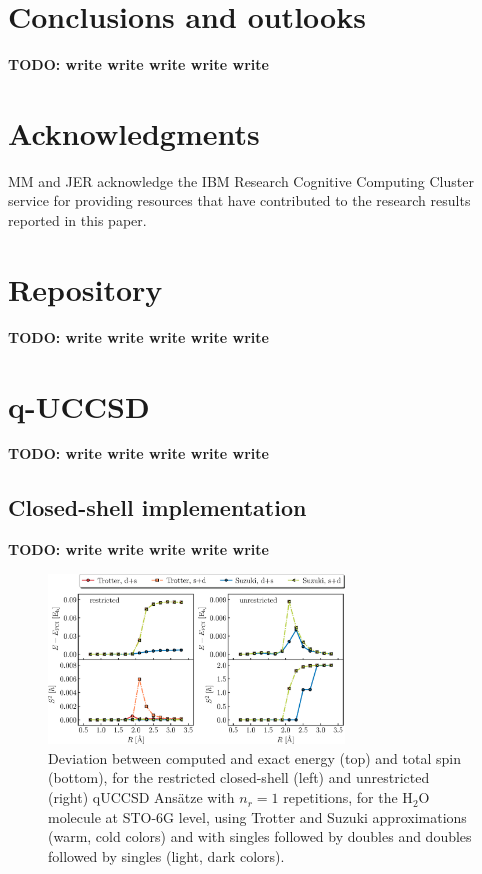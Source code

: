 \documentclass[aps,pra,onecolumn]{revtex4-2}
\newcommand{\todo}[1]{{\bf{{\color{red}TODO: #1}}}}
\begin{document}
\section{Conclusions and outlooks}
\label{sec:conclusions}

\todo{write write write write write}


\section*{Acknowledgments}

MM and JER acknowledge the IBM Research Cognitive Computing Cluster service for providing resources that have contributed to the research results reported in this paper.

\appendix

\section{Repository}
\label{sec:github}

\todo{write write write write write}

\section{q-UCCSD}
\label{sec:cc_trotter}

\todo{write write write write write}

\subsection{Closed-shell implementation}

\todo{write write write write write}

\begin{figure}[t!]
\includegraphics[width=0.7\textwidth]{../figures/qUCCSD_flavors/quccsd_reps_1.eps}
\caption{Deviation between computed and exact energy (top) and total spin (bottom), for the restricted closed-shell (left) and unrestricted (right) qUCCSD Ans\"{a}tze with $n_r=1$ repetitions, for the H$_2$O molecule at STO-6G level, using Trotter and Suzuki approximations (warm, cold colors) and with singles followed by doubles and doubles followed by singles (light, dark colors).}
\label{figure:quccsd_reps_1}
\end{figure} 
\end{document}
